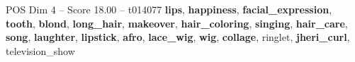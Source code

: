 \begin{textsample}{POS Dim 4 – Score 18.00 – t014077}  \label{ex:f4_pos_031}
\textbf{lips}, \textbf{happiness}, \textbf{facial\_expression}, \textbf{tooth}, \textbf{blond}, \textbf{long\_hair}, \textbf{makeover}, \textbf{hair\_coloring}, \textbf{singing}, \textbf{hair\_care}, \textbf{song}, \textbf{laughter}, \textbf{lipstick}, \textbf{afro}, \textbf{lace\_wig}, \textbf{wig}, \textbf{collage}, ringlet, \textbf{jheri\_curl}, television\_show

\end{textsample}
